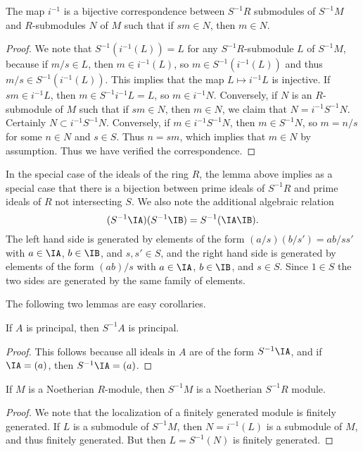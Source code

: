 \begin{lemma}
    The map $i^{-1}$ is a bijective correspondence between $S^{-1}R$ submodules of $S^{-1}M$ and $R$-submodules $N$ of $M$ such that if $sm \in N$, then $m \in N$.
\end{lemma}
\begin{proof}
    We note that $S^{-1}(i^{-1}(L)) = L$ for any $S^{-1}R$-submodule $L$ of $S^{-1}M$, because if $m/s \in L$, then $m \in i^{-1}(L)$, so $m \in S^{-1}(i^{-1}(L))$ and thus $m/s \in S^{-1}(i^{-1}(L))$. This implies that the map $L \mapsto i^{-1}L$ is injective. If $sm \in i^{-1}L$, then $m \in S^{-1}i^{-1}L = L$, so $m \in i^{-1}N$. Conversely, if $N$ is an $R$-submodule of $M$ such that if $sm \in N$, then $m \in N$, we claim that $N = i^{-1}S^{-1}N$. Certainly $N \subset i^{-1}S^{-1}N$. Conversely, if $m \in i^{-1}S^{-1}N$, then $m \in S^{-1}N$, so $m = n/s$ for some $n \in N$ and $s \in S$. Thus $n = sm$, which implies that $m \in N$ by assumption. Thus we have verified the correspondence.
\end{proof}

\begin{remark}
    In the special case of the ideals of the ring $R$, the lemma above implies as a special case that there is a bijection between prime ideals of $S^{-1}R$ and prime ideals of $R$ not intersecting $S$. We also note the additional algebraic relation
    \[ (S^{-1} \IA) (S^{-1} \IB) = S^{-1}(\IA \IB). \]
    The left hand side is generated by elements of the form $(a/s)(b/s') = ab/ss'$ with $a \in \IA$, $b \in \IB$, and $s,s' \in S$, and the right hand side is generated by elements of the form $(ab)/s$ with $a \in \IA$, $b \in \IB$, and $s \in S$. Since $1 \in S$ the two sides are generated by the same family of elements.
\end{remark}

The following two lemmas are easy corollaries.

\begin{prop}
    If $A$ is principal, then $S^{-1}A$ is principal.
\end{prop}
\begin{proof}
    This follows because all ideals in $A$ are of the form $S^{-1} \IA$, and if $\IA = (a)$, then $S^{-1}\IA = (a)$.
\end{proof}

\begin{prop}
    If $M$ is a Noetherian $R$-module, then $S^{-1}M$ is a Noetherian $S^{-1}R$ module.
\end{prop}
\begin{proof}
    We note that the localization of a finitely generated module is finitely generated. If $L$ is a submodule of $S^{-1}M$, then $N = i^{-1}(L)$ is a submodule of $M$, and thus finitely generated. But then $L = S^{-1}(N)$ is finitely generated.
\end{proof}

